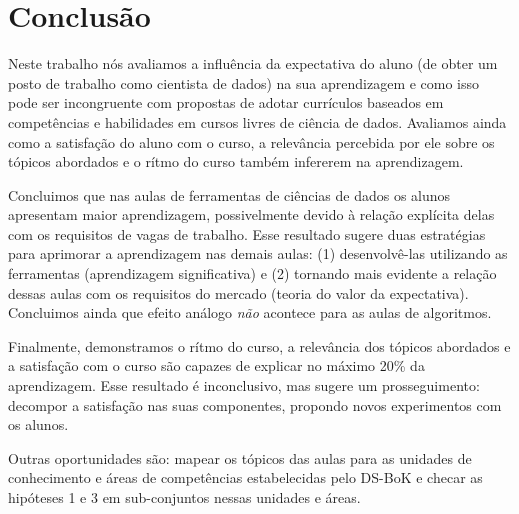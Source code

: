\section{Conclusão}

Neste trabalho nós avaliamos a influência da expectativa do aluno (de obter um posto de trabalho como cientista de dados) na sua aprendizagem e como isso pode ser incongruente com propostas de adotar currículos baseados em competências e habilidades em cursos livres de ciência de dados.
Avaliamos ainda como a satisfação do aluno com o curso, a relevância percebida por ele sobre os tópicos abordados e o rítmo do curso também infererem na aprendizagem.

Concluimos que nas aulas de ferramentas de ciências de dados os alunos apresentam maior aprendizagem, possivelmente devido à relação explícita delas com os requisitos de vagas de trabalho.
Esse resultado sugere duas estratégias para aprimorar a aprendizagem nas demais aulas: (1) desenvolvê-las utilizando as ferramentas (aprendizagem significativa) e (2) tornando mais evidente a relação dessas aulas com os requisitos do mercado (teoria do valor da expectativa).
Concluimos ainda que efeito análogo \emph{não} acontece para as aulas de algoritmos.

Finalmente, demonstramos o rítmo do curso, a relevância dos tópicos abordados e a satisfação com o curso são capazes de explicar no máximo 20\% da aprendizagem.
Esse resultado é inconclusivo, mas sugere um prosseguimento: decompor a satisfação nas suas componentes, propondo novos experimentos com os alunos.

Outras oportunidades são: mapear os tópicos das aulas para as unidades de conhecimento e áreas de competências estabelecidas pelo DS-BoK \cite{Demchenko2017} e checar as hipóteses 1 e 3 em sub-conjuntos nessas unidades e áreas.
